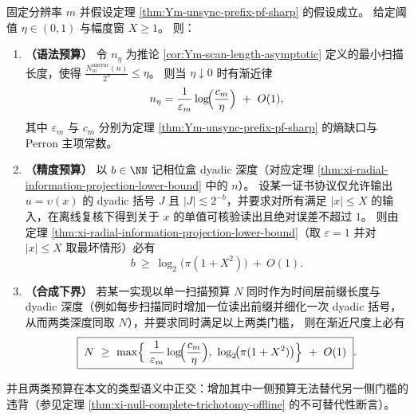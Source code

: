 \begin{corollary}\label{cor:xi-legal-readout-prefix-double-budget}
固定分辨率 \(m\) 并假设定理 \ref{thm:Ym-unsync-prefix-pf-sharp} 的假设成立。
给定阈值 \(\eta\in(0,1)\) 与幅度窗 \(X\ge 1\)。
则：
\begin{enumerate}
  \item \textbf{（语法预算）}
  令 \(n_{\eta}\) 为推论 \ref{cor:Ym-scan-length-asymptotic} 定义的最小扫描长度，使得
  \(\frac{N_m^{\mathrm{unsync}}(n)}{2^n}\le \eta\)。
  则当 \(\eta\downarrow 0\) 时有渐近律
  \[
  n_{\eta}
  =\frac{1}{\varepsilon_m}\log\!\Bigl(\frac{c_m}{\eta}\Bigr)\ +\ O(1),
  \]
  其中 \(\varepsilon_m\) 与 \(c_m\) 分别为定理 \ref{thm:Ym-unsync-prefix-pf-sharp} 的熵缺口与 Perron 主项常数。
  \item \textbf{（精度预算）}
  以 \(b\in\NN\) 记相位盒 dyadic 深度（对应定理 \ref{thm:xi-radial-information-projection-lower-bound} 中的 \(n\)）。
  设某一证书协议仅允许输出 \(u=\upsilon(x)\) 的 dyadic 括号 \(J\) 且 \(|J|\lesssim 2^{-b}\)，并要求对所有满足 \(|x|\le X\) 的输入，在离线复核下得到关于 \(x\) 的单值可核验读出且绝对误差不超过 \(1\)。
  则由定理 \ref{thm:xi-radial-information-projection-lower-bound}（取 \(\varepsilon=1\) 并对 \(|x|\le X\) 取最坏情形）必有
  \[
  b\ \ge\ \log_2\!\bigl(\pi(1+X^2)\bigr)\ +\ O(1).
  \]
  \item \textbf{（合成下界）}
  若某一实现以单一扫描预算 \(N\) 同时作为时间层前缀长度与 dyadic 深度（例如每步扫描同时增加一位读出前缀并细化一次 dyadic 括号，从而两类深度同取 \(N\)），并要求同时满足以上两类门槛，
  则在渐近尺度上必有
  \begin{equation}\label{eq:xi-legal-readout-prefix-max-budget}
  \boxed{\;
  N\ \ge\ \max\Bigl\{\ \frac{1}{\varepsilon_m}\log\!\Bigl(\frac{c_m}{\eta}\Bigr),\ \log_2\!\bigl(\pi(1+X^2)\bigr)\Bigr\}\ +\ O(1)\; }.
  \end{equation}
\end{enumerate}
并且两类预算在本文的类型语义中正交：增加其中一侧预算无法替代另一侧门槛的违背（参见定理 \ref{thm:xi-null-complete-trichotomy-offline} 的不可替代性断言）。
\end{corollary}

